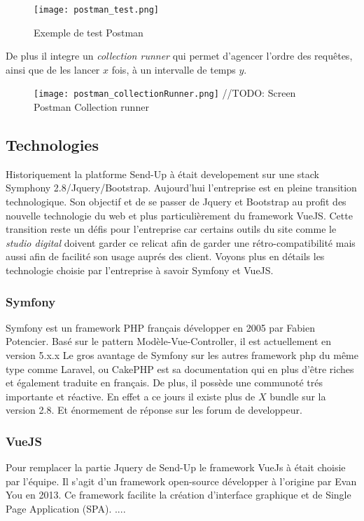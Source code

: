 \begin{figure}[htbp]
    \center
        \texttt{[image: postman\_test.png]}
        \caption{Exemple de test Postman}
\end{figure}

De plus il integre un \textit{collection runner} qui permet d'agencer l'ordre des requêtes, ainsi que de les lancer $x$ fois, à un intervalle de temps $y$. 

\begin{figure}[htbp]
    \center
    \texttt{[image: postman\_collectionRunner.png]}
        //TODO: Screen Postman Collection runner
\end{figure}

\subsection{Technologies}

Historiquement la platforme Send-Up à était developement sur une stack Symphony 2.8/Jquery/Bootstrap. Aujourd'hui l'entreprise est en pleine transition technologique. Son objectif et de se passer de Jquery et Bootstrap au profit des nouvelle technologie du web et plus particulièrement du framework VueJS. Cette transition reste un défis pour l'entreprise car certains outils du site comme le \textit{studio digital} doivent garder ce relicat afin de garder une rétro-compatibilité mais aussi afin de facilité son usage auprés des client. Voyons plus en détails les technologie choisie par l'entreprise à savoir Symfony et VueJS.

\subsubsection{Symfony}
Symfony est un framework PHP français développer en 2005 par Fabien Potencier. Basé sur le pattern Modèle-Vue-Controller, il est actuellement en version 5.x.x  Le gros avantage de Symfony sur les autres framework php du même type comme Laravel, ou CakePHP est sa documentation qui en plus d'être riches et également traduite en français. De plus, il possède une communoté trés importante et réactive. En effet a ce jours il existe plus de $X$ bundle sur la version 2.8. Et énormement de réponse sur les forum de developpeur.


\subsubsection{VueJS}
Pour remplacer la partie Jquery de Send-Up le framework VueJs à était choisie par l'équipe. Il s'agit d'un framework open-source développer à l'origine par Evan You en 2013. Ce framework facilite la création d'interface graphique et de Single Page Application (SPA). ....
